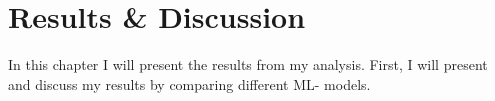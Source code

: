 \chapter{Results \& Discussion}\label{subsec:ResDisc}
In this chapter I will present the results from my analysis. First,
I will present and discuss my results by comparing different \ac{ML}-
models.  

